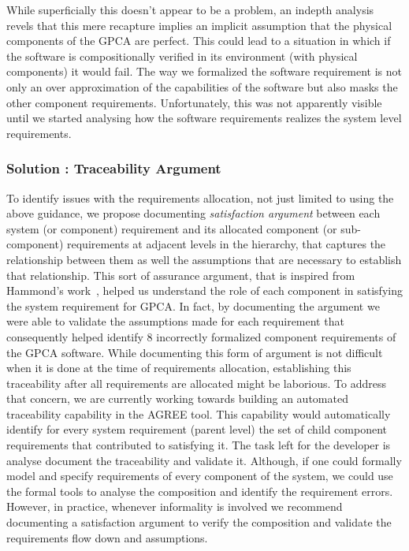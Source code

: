 While superficially this doesn't appear to be a problem, an indepth analysis revels that this mere recapture implies an implicit assumption that the  physical components of the GPCA are perfect. This could lead to a situation in which if the software is compositionally verified in its environment (with physical components) it would fail. The way we formalized the software requirement is not only an over approximation of the capabilities of the software but also masks the other component requirements. Unfortunately, this was not apparently visible until we started analysing how the software requirements realizes the system level requirements.

\subsubsection {Solution : Traceability Argument}
To identify issues with the requirements allocation, not just limited to using the above guidance, we propose documenting \emph{satisfaction argument} between each system (or component) requirement and its allocated component (or sub-component) requirements at adjacent levels in the hierarchy, that captures the relationship between them as well the assumptions that are necessary to establish that relationship. This sort of assurance argument, that is inspired from Hammond's work~\cite{Hammond01:WiW}, helped us understand the role of each component in satisfying the system requirement for GPCA. In fact, by documenting the argument we were able to validate the assumptions made for each requirement that consequently helped identify 8 incorrectly formalized component requirements of the GPCA software. While documenting this form of argument is not difficult when it is done at the time of requirements allocation, establishing this traceability after all requirements are allocated might be laborious. To address that concern, we are currently working towards building an automated traceability capability in the AGREE tool. This capability would automatically identify for every system requirement (parent level) the set of child component requirements that contributed to satisfying it. The task left for the developer is analyse document the traceability and validate it. Although, if one could formally model and specify requirements of every component of the system, we could use the formal tools to analyse the composition and identify the requirement errors. However, in practice, whenever informality is involved we recommend documenting a satisfaction argument to verify the composition and validate the requirements flow down and assumptions. 